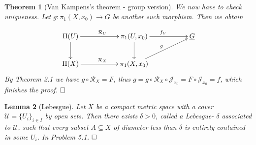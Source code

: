\documentclass[11pt]{book}
\numberwithin{dummy}{section}
\newtheorem{theorem}{Theorem}[section]
\newtheorem{lemma}[theorem]{Lemma}
\theoremstyle{nonumberbreak}
\newenvironment{pr}[1][]{\ifthenelse{\equal{#1}{}}{\proof}{\proof[#1]}\rm}{\endproof}
\newcommand{\la}{\longrightarrow}
\begin{document}
\begin{spacing}{1.4}
\begin{theorem}[Van Kampens's theorem - group version]
\begin{pr}
We now have to check uniqueness. Let $g: \pi_1(X,x_0) \la \underline{G}$ be another such morphism. Then we obtain

$$
\begin{xy}
\xymatrix{
\Pi(U) \ar[d] \ar[rr]^{\mathcal{R}_U} && \pi_1(U,x_0) \ar[d] \ar[rr]^{f_U} && \underline{G} \\ \Pi(X) \ar[rr]^{\mathcal{R}_X} && \pi_1(X,x_0) \ar[rru]^{g}
}
\end{xy}
$$
By Theorem 2.1 we have $g \circ \mathcal{R}_X = F$, thus $g= g \circ \mathcal{R}_X \circ \mathcal{J}_{x_0} = F \circ \mathcal{J}_{x_0} = f$, which finishes the proof. $\hfill \Box$

\end{pr}

\end{theorem}



\begin{lemma}[Lebesgue]
Let $X$ be a compact metric space with a cover $\mathcal{U} = \{U_i\}_{i \in I}$ by open sets. Then there exists $\delta >0$, called a \textit{Lebesgue-} $\delta$ associated to $\mathcal{U}$, such that every subset $A \subseteq X$ of diameter less than $\delta$ is entirely contained in some $U_i$.
\begin{pr}
In Problem 5.1. $\hfill \Box$
\end{pr}
\end{lemma}



\end{spacing}
\end{document}
